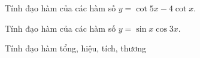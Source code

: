 \begin{bt}%
	Tính đạo hàm của các hàm số $y=\cot{5x}-4\cot{x}$.
\end{bt}
\begin{bt}%
	Tính đạo hàm của các hàm số $y=\sin{x}\cos{3x}$.
\end{bt}
\begin{dang}{Tính đạo hàm tổng, hiệu, tích, thương}
\end{dang}
